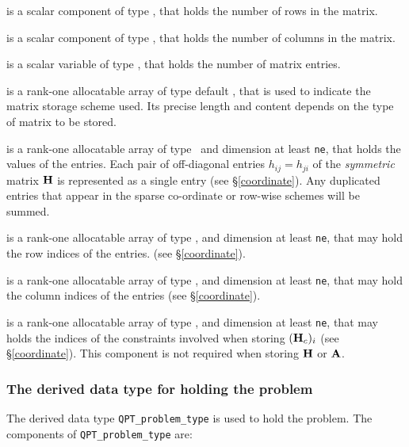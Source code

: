 \documentclass{galahad}
\begin{document}
\begin{description}

 is a scalar component of type \integer,
that holds the number of rows in the matrix.

 is a scalar component of type \integer,
that holds the number of columns in the matrix.

 is a scalar variable of type \integer, that
holds the number of matrix entries.

 is a rank-one allocatable array of type default \character, that
is used to indicate the matrix storage scheme used. Its precise length and
content depends on the type of matrix to be stored.

 is a rank-one allocatable array of type \realdp\,
and dimension at least {\tt ne}, that holds the values of the entries.
Each pair of off-diagonal entries $h_{ij} = h_{ji}$ of the {\em symmetric}
matrix ${\mathbf{H}}$ is represented as a single entry
(see \S\ref{coordinate}).
Any duplicated entries that appear in the sparse
co-ordinate or row-wise schemes will be summed.

 is a rank-one allocatable array of type \integer,
and dimension at least {\tt ne}, that may hold the row indices of the entries.
(see \S\ref{coordinate}).

 is a rank-one allocatable array of type \integer,
and dimension at least {\tt ne}, that may hold the column indices of the entries
(see \S\ref{coordinate}).

 is a rank-one allocatable array of type \integer,
and dimension at least {\tt ne}, that may holds the indices of the
constraints involved when storing $({\mathbf{H}}_c)_i$
(see \S\ref{coordinate}).
This component is not required when storing ${\mathbf{H}}$ or ${\mathbf{A}}$.

\end{description}


\subsubsection{The derived data type for holding the problem}\label{typeprob}
The derived data type {\tt QPT\_problem\_type} is used to hold
the problem. The components of
{\tt QPT\_problem\_type}
are:
\end{document}
